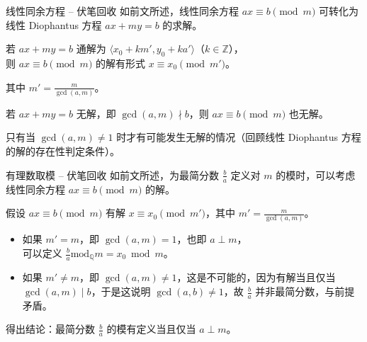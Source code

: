 \documentclass{../pkslide}
\begin{document}
\begin{frame}{线性同余方程 -- 伏笔回收}
  如前文所述，线性同余方程 $a x \equiv b \pmod{m}$ 可转化为线性 Diophantus 方程 $a x + m y = b$ 的求解。
  
  \emptyline
  
  若 $a x + m y = b$ 通解为 $\langle x_0 + k m', y_0 + k a' \rangle$（$k \in \mathbb Z$），\\
  则 $a x \equiv b \pmod{m}$ 的解有形式 $x \equiv x_0 \pmod{m'}$。
  
  其中 $m' = \frac{m}{\gcd(a, m)}$。
  
  \emptyline
  
  若 $a x + m y = b$ 无解，即 $\gcd(a, m) \nmid b$，则 $a x \equiv b \pmod{m}$ 也无解。
  
  只有当 $\gcd(a, m) \ne 1$ 时才有可能发生无解的情况（回顾线性 Diophantus 方程的解的存在性判定条件）。
\end{frame}

\begin{frame}{有理数取模 -- 伏笔回收}
  如前文所述，为最简分数 $\frac{b}{a}$ 定义对 $m$ 的模时，可以考虑线性同余方程 $a x \equiv b \pmod{m}$ 的解。
  
  \emptyline
  
  假设 $a x \equiv b \pmod{m}$ 有解 $x \equiv x_0 \pmod{m'}$，其中 $m' = \frac{m}{\gcd(a, m)}$。
  
  \begin{itemize}
    \item 如果 $m' = m$，即 $\gcd(a, m) = 1$，也即 $a \perp m$，\\
      \-\hspace{2em}可以定义 $\frac{b}{a} \mathbin{\mathrm{mod}_{\mathbb Q}} m = x_0 \bmod m$。
    \item 如果 $m' \ne m$，即 $\gcd(a, m) \ne 1$，这是不可能的，因为有解当且仅当 $\gcd(a, m) \mid b$，于是这说明 $\gcd(a, b) \ne 1$，故 $\frac{b}{a}$ 并非最简分数，与前提矛盾。
  \end{itemize}
  
  \emptyline
  
  得出结论：最简分数 $\frac{b}{a}$ 的模有定义当且仅当 $a \perp m$。
\end{frame}
\end{document}
